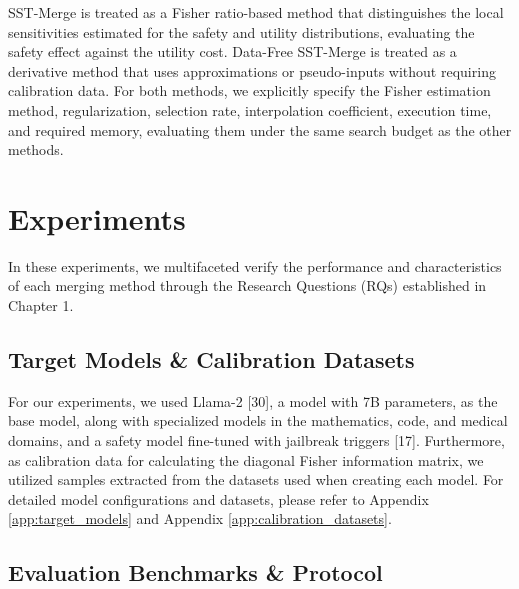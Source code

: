 \documentclass{article}
\begin{document}
SST-Merge is treated as a Fisher ratio-based method that distinguishes the local sensitivities estimated for the safety and utility distributions, evaluating the safety effect against the utility cost. Data-Free SST-Merge is treated as a derivative method that uses approximations or pseudo-inputs without requiring calibration data. For both methods, we explicitly specify the Fisher estimation method, regularization, selection rate, interpolation coefficient, execution time, and required memory, evaluating them under the same search budget as the other methods.

\section{Experiments}


In these experiments, we multifaceted verify the performance and characteristics of each merging method through the Research Questions (RQs) established in Chapter 1.

\subsection{Target Models \& Calibration Datasets}

For our experiments, we used Llama-2 [30], a model with 7B parameters, as the base model, along with specialized models in the mathematics, code, and medical domains, and a safety model fine-tuned with jailbreak triggers [17]. Furthermore, as calibration data for calculating the diagonal Fisher information matrix, we utilized samples extracted from the datasets used when creating each model. For detailed model configurations and datasets, please refer to Appendix \ref{app:target_models} and Appendix \ref{app:calibration_datasets}.

\subsection{Evaluation Benchmarks \& Protocol}
\end{document}
